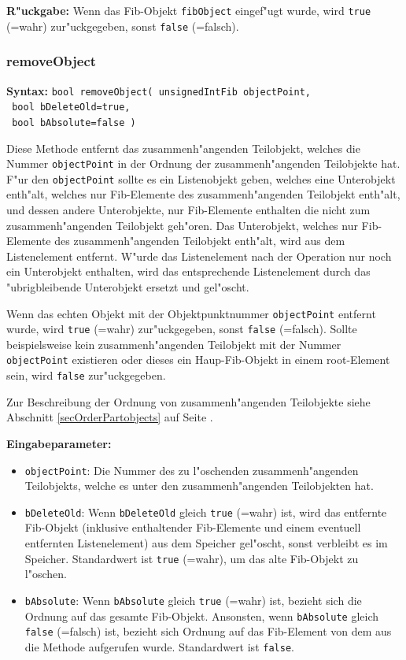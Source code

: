 \bigskip\noindent
\textbf{R"uckgabe:} Wenn das Fib-Objekt \verb|fibObject| eingef"ugt wurde, wird \verb|true| (=wahr) zur"uckgegeben, sonst \verb|false| (=falsch).


\subsubsection{removeObject}

\textbf{Syntax:} \verb|bool removeObject( unsignedIntFib objectPoint,| \\\verb| bool bDeleteOld=true,| \\\verb| bool bAbsolute=false )|

\bigskip\noindent
Diese Methode entfernt das zusammenh"angenden Teilobjekt, welches die Nummer \verb|objectPoint| in der Ordnung der zusammenh"angenden Teilobjekte hat. F"ur den \verb|objectPoint| sollte es ein Listenobjekt geben, welches eine Unterobjekt enth"alt, welches nur Fib-Elemente des zusammenh"angenden Teilobjekt enth"alt, und dessen andere Unterobjekte, nur Fib-Elemente enthalten die nicht zum zusammenh"angenden Teilobjekt geh"oren. Das Unterobjekt, welches nur Fib-Elemente des zusammenh"angenden Teilobjekt enth"alt, wird aus dem Listenelement entfernt. W"urde das Listenelement nach der Operation nur noch ein Unterobjekt enthalten, wird das entsprechende Listenelement durch das "ubrigbleibende Unterobjekt ersetzt und gel"oscht.

Wenn das echten Objekt mit der Objektpunktnummer \verb|objectPoint| entfernt wurde, wird \verb|true| (=wahr) zur"uckgegeben, sonst \verb|false| (=falsch). Sollte beispielsweise kein zusammenh"angenden Teilobjekt mit der Nummer \verb|objectPoint| existieren oder dieses ein Haup-Fib-Objekt in einem root-Element sein, wird \verb|false| zur"uckgegeben.

Zur Beschreibung der Ordnung von zusammenh"angenden Teilobjekte siehe Abschnitt \ref{secOrderPartobjects} auf Seite \pageref{secOrderPartobjects} .

\bigskip\noindent
\textbf{Eingabeparameter:} 
\begin{itemize}
 \item \verb|objectPoint|: Die Nummer des zu l"oschenden zusammenh"angenden Teilobjekts, welche es unter den zusammenh"angenden Teilobjekten hat.
 \item \verb|bDeleteOld|: Wenn \verb|bDeleteOld| gleich \verb|true| (=wahr) ist, wird das entfernte Fib-Objekt (inklusive enthaltender Fib-Elemente und einem eventuell entfernten Listenelement) aus dem Speicher gel"oscht, sonst verbleibt es im Speicher. Standardwert ist \verb|true| (=wahr), um das alte Fib-Objekt zu l"oschen.
 \item \verb|bAbsolute|: Wenn \verb|bAbsolute| gleich \verb|true| (=wahr) ist, bezieht sich die Ordnung auf das gesamte Fib-Objekt. Ansonsten, wenn \verb|bAbsolute| gleich \verb|false| (=falsch) ist, bezieht sich Ordnung auf das Fib-Element von dem aus die Methode aufgerufen wurde. Standardwert ist \verb|false|.
\end{itemize}

